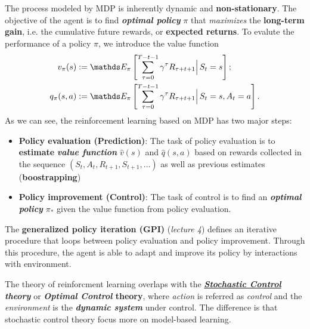 \documentclass[11pt]{article}
\begin{document}
\begin{itemize}
The process modeled by MDP is inherently dynamic and \textbf{non-stationary}. The objective of the agent is to find \emph{\textbf{optimal policy}} $\pi$ that \emph{maximizes} the  \textbf{long-term gain}, i.e. the cumulative future rewards,  or \textbf{expected returns}. To evalute the performance of a policy $\pi$, we introduce the value function 
\begin{align*}
v_{\pi}(s) &:= \E{\pi}{\sum_{\tau=0}^{T-t-1}\gamma^{\tau}R_{\tau+t+1} \Big|\, S_t = s};\\
q_{\pi}(s, a) &:= \E{\pi}{\sum_{\tau=0}^{T-t-1}\gamma^{\tau}R_{\tau+t+1} \Big|\, S_t = s, A_{t} = a}.
\end{align*} As we can see, the reinforcement learning based on MDP has two major steps:
\begin{itemize}
\item \textbf{Policy evaluation (Prediction)}: The task of policy evaluation is to \textbf{estimate} \emph{\textbf{value function}} $\hat{v}(s)$ and $\hat{q}(s, a)$ based on rewards collected in the sequence $(S_t, A_t, R_{t+1}, S_{t+1}, \ldots)$ as well as previous estimates (\textbf{boostrapping})

\item \textbf{Policy improvement (Control)}: The task of control is to find an \emph{\textbf{optimal policy}} $\pi_{*}$ given the value function from policy evaluation.
\end{itemize}The \textbf{generalized policy iteration (GPI)} (\emph{lecture 4}) defines an iterative procedure that loops between policy evaluation and policy improvement. Through this procedure, the agent is able to adapt and improve its policy by interactions with environment.  
\end{itemize} The theory of reinforcment learning overlaps with the \emph{\textbf{\underline{Stochastic Control} theory}} \citep{puterman2014markov} or \textbf{\emph{Optimal Control} theory}, where  \emph{action} is referred as \emph{control} and the \emph{environment} is the \emph{\textbf{dynamic system}} under control. The difference is that stochastic control theory focus more on model-based learning.
\end{document}
